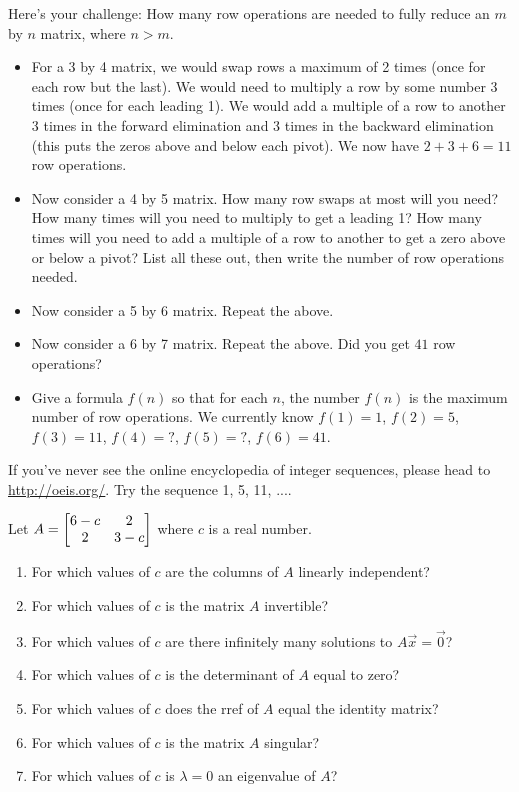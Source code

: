 \begin{problem*}
Here's your challenge:  How many row operations are needed to fully reduce an $m$ by $n$ matrix, where $n>m$.
\begin{itemize}
 \item For a 3 by 4 matrix, we would swap rows a maximum of 2 times (once for each row but the last).  We would need to multiply a row by some number 3 times (once for each leading 1). We would add a multiple of a row to another 3 times in the forward elimination and 3 times in the backward elimination (this puts the zeros above and below each pivot). We now have $2+3+6 = 11$ row operations.
 \item Now consider a 4 by 5 matrix. How many row swaps at most will you need?  How many times will you need to multiply to get a leading 1?  How many times will you need to add a multiple of a row to another to get a zero above or below a pivot?  List all these out, then write the number of row operations needed.
 \item Now consider a 5 by 6 matrix. Repeat the above.
 \item Now consider a 6 by 7 matrix. Repeat the above. Did you get $41$ row operations?
 \item Give a formula $f(n)$ so that for each $n$, the number $f(n)$ is the maximum number of row operations. We currently know $f(1)=1$, $f(2)=5$, $f(3)=11$, $f(4)=?$, $f(5)=?$, $f(6)=41$. 
\end{itemize}
If you've never see the online encyclopedia of integer sequences, please head to \href{http://oeis.org/}{http://oeis.org/}. Try the sequence 1, 5, 11, ....  
\end{problem*}




\begin{problem}
Let $A=\begin{bmatrix} 6-c&2\\2&3-c \end{bmatrix}$ where $c$ is a real number.
\begin{enumerate}
 \item For which values of $c$ are the columns of $A$ linearly independent?
 \item For which values of $c$ is the matrix $A$ invertible?
 \item For which values of $c$ are there infinitely many solutions to $A\vec x = \vec 0$?
 \item For which values of $c$ is the determinant of $A$ equal to zero?
 \item For which values of $c$ does the rref of $A$ equal the identity matrix?
 \item For which values of $c$ is the matrix $A$ singular?
 \item For which values of $c$ is $\lambda=0$ an eigenvalue of $A$?
\end{enumerate}
\end{problem}


